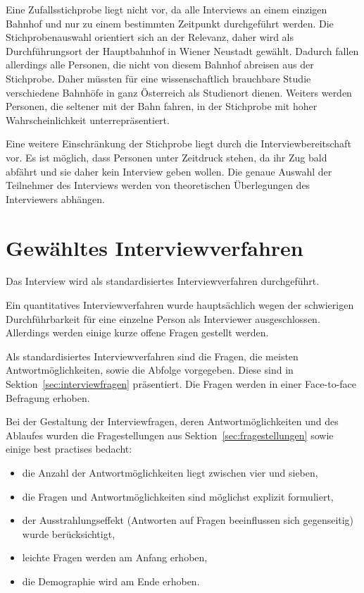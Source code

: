 \documentclass[]{article}
\begin{document}
Eine Zufallsstichprobe liegt nicht vor, da alle Interviews an einem einzigen Bahnhof und nur zu einem bestimmten Zeitpunkt durchgeführt werden. Die Stichprobenauswahl orientiert sich an der Relevanz, daher wird als Durchführungsort der Hauptbahnhof in Wiener Neustadt gewählt. Dadurch fallen allerdings alle Personen, die nicht von diesem Bahnhof abreisen aus der Stichprobe. Daher müssten für eine wissenschaftlich brauchbare Studie verschiedene Bahnhöfe in ganz Österreich als Studienort dienen. Weiters werden Personen, die seltener mit der Bahn fahren, in der Stichprobe mit hoher Wahrscheinlichkeit unterrepräsentiert.

Eine weitere Einschränkung der Stichprobe liegt durch die Interviewbereitschaft vor. Es ist möglich, dass Personen unter Zeitdruck stehen, da ihr Zug bald abfährt und sie daher kein Interview geben wollen. Die genaue Auswahl der Teilnehmer des Interviews werden von theoretischen Überlegungen des Interviewers abhängen.

\section{Gewähltes Interviewverfahren}
Das Interview wird als standardisiertes Interviewverfahren durchgeführt.

Ein quantitatives Interviewverfahren wurde hauptsächlich wegen der schwierigen Durchführbarkeit für eine einzelne Person als Interviewer ausgeschlossen. Allerdings werden einige kurze offene Fragen gestellt werden.

Als standardisiertes Interviewverfahren sind die Fragen, die meisten Antwortmöglichkeiten, sowie die Abfolge vorgegeben. Diese sind in Sektion~\ref{sec:interviewfragen} präsentiert. Die Fragen werden in einer Face-to-face Befragung erhoben.

Bei der Gestaltung der Interviewfragen, deren Antwortmöglichkeiten und des Ablaufes wurden die Fragestellungen aus Sektion~\ref{sec:fragestellungen} sowie einige best practises bedacht:
\begin{itemize}
	\item die Anzahl der Antwortmöglichkeiten liegt zwischen vier und sieben,
	\item die Fragen und Antwortmöglichkeiten sind möglichst explizit formuliert,
	\item der Ausstrahlungseffekt (Antworten auf Fragen beeinflussen sich gegenseitig) wurde berücksichtigt,
	\item leichte Fragen werden am Anfang erhoben,
	\item die Demographie wird am Ende erhoben.
\end{itemize}
\end{document}
